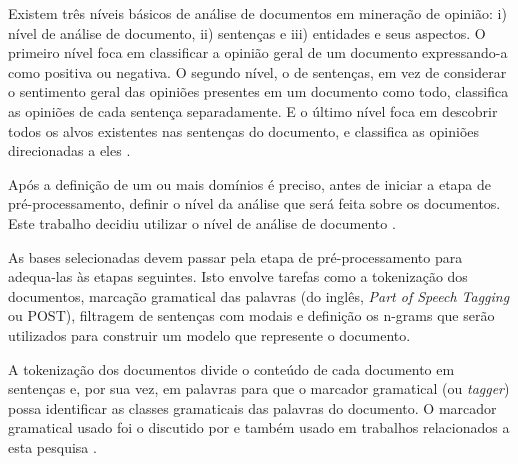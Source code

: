
Existem três níveis básicos de análise de documentos em mineração de opinião: i) nível de análise de documento, ii) sentenças e iii) entidades e seus aspectos. O primeiro nível foca em classificar a opinião geral de um documento expressando-a como positiva ou negativa. O segundo nível, o de sentenças, em vez de considerar o sentimento geral das opiniões presentes em um documento como todo, classifica as opiniões de cada sentença separadamente. E o último nível foca em descobrir todos os alvos existentes nas sentenças do documento, e classifica as opiniões direcionadas a eles \cite{bing:2012}. 

Após a definição de um ou mais domínios é preciso, antes de iniciar a etapa de pré-processamento, definir o nível da análise que será feita sobre os documentos. Este trabalho decidiu utilizar o nível de análise de documento  \cite{joachims1998text, pang2002thumbs, gamon2004sentiment, mullen2004sentiment, pang2004sentimental, cui2006comparative}. 

As bases selecionadas devem passar pela etapa de pré-processamento para adequa-las às etapas seguintes. Isto envolve tarefas como    a tokenização dos documentos, marcação gramatical das palavras (do inglês, \textit{Part of Speech Tagging} ou POST), filtragem de sentenças com modais e definição os n-grams que serão utilizados para construir um modelo que represente o documento. 

A tokenização dos documentos divide o conteúdo de cada documento em sentenças e, por sua vez, em palavras para que o marcador gramatical (ou \textit{tagger}) possa identificar as classes gramaticais das palavras do documento. O marcador gramatical usado foi o discutido   por  e também usado em trabalhos relacionados a esta pesquisa \cite{chaovalit2005movie, taboada2008extracting, taboada2011lexicon}. 

